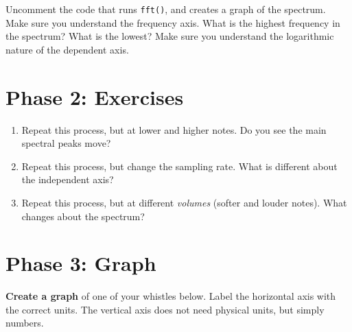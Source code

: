 \documentclass[10.5pt]{article}
\begin{document}
Uncomment the code that runs \verb+fft()+, and creates a graph of the spectrum.  Make sure you understand the frequency axis.  What is the highest frequency in the spectrum?  What is the lowest?  Make sure you understand the logarithmic nature of the dependent axis.

\section{Phase 2: Exercises}

\begin{enumerate}
\item Repeat this process, but at lower and higher notes.  Do you see the main spectral peaks move?
\item Repeat this process, but change the sampling rate.  What is different about the independent axis?
\item Repeat this process, but at different \textit{volumes} (softer and louder notes).  What changes about the spectrum?
\end{enumerate}

\section{Phase 3: Graph}

\textbf{Create a graph} of one of your whistles below.  Label the horizontal axis with the correct units.  The vertical axis does not need physical units, but simply numbers.
\end{document}
